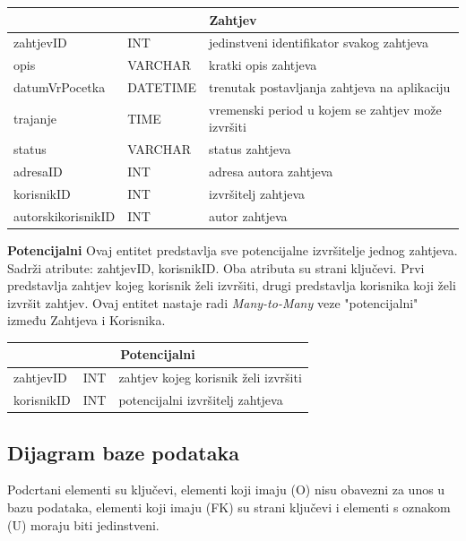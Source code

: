 			\begin{tabularx} {\textwidth} {|p{3.5cm}|p{2cm}|X|}
				
				\hline
				\multicolumn{3}{|c|}{\textbf{Zahtjev}} \\
				\hline
				
				\cellcolor{LightGreen}zahtjevID & INT	& jedinstveni identifikator svakog zahtjeva	\\ \hline
				opis	& VARCHAR &  kratki opis zahtjeva 	\\ \hline 
				datumVrPocetka & DATETIME &  trenutak postavljanja zahtjeva na aplikaciju \\ \hline 
				trajanje & TIME	&  vremenski period u kojem se zahtjev može izvršiti		\\ \hline 
				status & VARCHAR & status zahtjeva  \\ \hline
				\cellcolor{LightBlue} adresaID	& INT &  adresa autora zahtjeva 	\\ \hline 
				\cellcolor{LightBlue} korisnikID	& INT &  izvršitelj zahtjeva 	\\ \hline
				\cellcolor{LightBlue} autorskikorisnikID	& INT &   autor zahtjeva	\\ \hline
				
				
			\end{tabularx}
			
			\bigskip
			\bigskip
			\textbf{Potencijalni} Ovaj entitet predstavlja sve potencijalne izvršitelje jednog zahtjeva. Sadrži atribute: zahtjevID, korisnikID. Oba atributa su strani ključevi. Prvi predstavlja zahtjev kojeg korisnik želi izvršiti, drugi predstavlja korisnika koji želi izvršit zahtjev. Ovaj entitet nastaje radi \textit{Many-to-Many} veze "potencijalni" između Zahtjeva i Korisnika.
			\bigskip
			
			\begin{tabularx}{\textwidth} {|p{2cm}|p{2cm}|X|}
				\hline
				\multicolumn{3}{|c|}{\textbf{Potencijalni}} \\
				\hline
				\cellcolor{LightGreen} zahtjevID & INT & zahtjev kojeg korisnik želi izvršiti \\
				\hline
				\cellcolor{LightGreen} korisnikID & INT & potencijalni izvršitelj zahtjeva \\
				\hline
			\end{tabularx}
			
			
			
			\newpage
 			\subsection{Dijagram baze podataka}
			Podcrtani elementi su ključevi, elementi koji imaju (O) nisu obavezni za unos u bazu podataka, elementi koji imaju (FK) su strani ključevi i elementi s oznakom (U) moraju biti jedinstveni.
			
